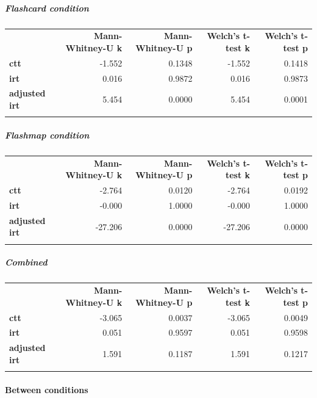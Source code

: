 \documentclass[]{article}
\begin{document}
\FloatBarrier
\subparagraph{Flashcard condition}\label{flashcard-condition}

\begin{longtable}[c]{@{}lrrrr@{}}
\toprule\addlinespace
& \textbf{Mann-Whitney-U k} & \textbf{Mann-Whitney-U p} &
\textbf{Welch's t-test k} & \textbf{Welch's t-test p}
\\\addlinespace
\midrule\endhead
\textbf{ctt} & -1.552 & 0.1348 & -1.552 & 0.1418
\\\addlinespace
\textbf{irt} & 0.016 & 0.9872 & 0.016 & 0.9873
\\\addlinespace
\textbf{adjusted irt} & 5.454 & 0.0000 & 5.454 & 0.0001
\\\addlinespace
\bottomrule
\end{longtable}

\FloatBarrier
\subparagraph{Flashmap condition}\label{flashmap-condition}

\begin{longtable}[c]{@{}lrrrr@{}}
\toprule\addlinespace
& \textbf{Mann-Whitney-U k} & \textbf{Mann-Whitney-U p} &
\textbf{Welch's t-test k} & \textbf{Welch's t-test p}
\\\addlinespace
\midrule\endhead
\textbf{ctt} & -2.764 & 0.0120 & -2.764 & 0.0192
\\\addlinespace
\textbf{irt} & -0.000 & 1.0000 & -0.000 & 1.0000
\\\addlinespace
\textbf{adjusted irt} & -27.206 & 0.0000 & -27.206 & 0.0000
\\\addlinespace
\bottomrule
\end{longtable}

\FloatBarrier
\subparagraph{Combined}\label{combined}

\begin{longtable}[c]{@{}lrrrr@{}}
\toprule\addlinespace
& \textbf{Mann-Whitney-U k} & \textbf{Mann-Whitney-U p} &
\textbf{Welch's t-test k} & \textbf{Welch's t-test p}
\\\addlinespace
\midrule\endhead
\textbf{ctt} & -3.065 & 0.0037 & -3.065 & 0.0049
\\\addlinespace
\textbf{irt} & 0.051 & 0.9597 & 0.051 & 0.9598
\\\addlinespace
\textbf{adjusted irt} & 1.591 & 0.1187 & 1.591 & 0.1217
\\\addlinespace
\bottomrule
\end{longtable}

\FloatBarrier
\paragraph{Between conditions}\label{between-conditions}
\end{document}
